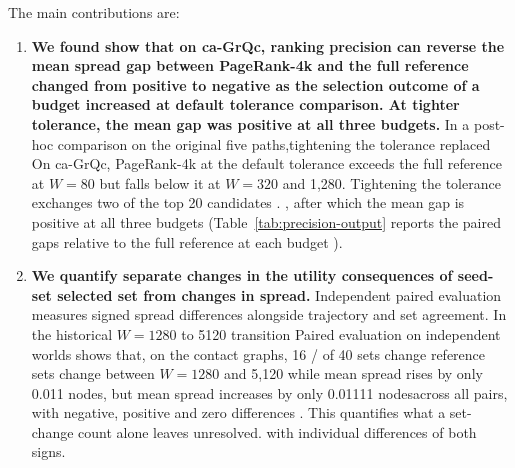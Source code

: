 \documentclass[smallextended]{svjour3}
\providecommand{\DIFaddtex}[1]{{\protect\color{blue} \sf #1}} %
\providecommand{\DIFdeltex}[1]{{\protect\color{red} \scriptsize #1}} %
\providecommand{\DIFaddbegin}{} %
\providecommand{\DIFaddend}{} %
\providecommand{\DIFdelbegin}{} %
\providecommand{\DIFdelend}{} %
\providecommand{\DIFadd}[1]{\texorpdfstring{\DIFaddtex{#1}}{#1}} %
\providecommand{\DIFdel}[1]{\texorpdfstring{\DIFdeltex{#1}}{}} %
\providecommand{\DIFscaledelfig}{0.5}
\newlength{\DIFdelgraphicswidth} %
\newlength{\DIFdelgraphicsheight} %
\providecommand{\DIFaddincludegraphics}[2][]{{\color{blue}\fbox{\DIFOincludegraphics[#1]{#2}}}} %
\providecommand{\DIFdelincludegraphics}[2][]{%
\sbox{\DIFdelgraphicsbox}{\DIFOincludegraphics[#1]{#2}}%
\settoboxwidth{\DIFdelgraphicswidth}{\DIFdelgraphicsbox} %
\settoboxtotalheight{\DIFdelgraphicsheight}{\DIFdelgraphicsbox} %
\scalebox{\DIFscaledelfig}{%
\parbox[b]{\DIFdelgraphicswidth}{\usebox{\DIFdelgraphicsbox}\\[-\baselineskip] \rule{\DIFdelgraphicswidth}{0em}}\llap{\resizebox{\DIFdelgraphicswidth}{\DIFdelgraphicsheight}{%
\setlength{\unitlength}{\DIFdelgraphicswidth}%
\begin{picture}(1,1)%
\thicklines\linethickness{2pt} %
{\color[rgb]{1,0,0}\put(0,0){\framebox(1,1){}}}%
{\color[rgb]{1,0,0}\put(0,0){\line( 1,1){1}}}%
{\color[rgb]{1,0,0}\put(0,1){\line(1,-1){1}}}%
\end{picture}%
}\hspace*{3pt}}} %
} %
\DeclareRobustCommand{\DIFaddbegin}{\DIFOaddbegin \let\includegraphics\DIFaddincludegraphics} %
\DeclareRobustCommand{\DIFaddend}{\DIFOaddend \let\includegraphics\DIFOincludegraphics} %
\DeclareRobustCommand{\DIFdelbegin}{\DIFOdelbegin \let\includegraphics\DIFdelincludegraphics} %
\DeclareRobustCommand{\DIFdelend}{\DIFOaddend \let\includegraphics\DIFOincludegraphics} %
\begin{document}
The main contributions are:
\begin{enumerate}
\item[(1)] \textbf{We \DIFdelbegin \DIFdel{found }\DIFdelend \DIFaddbegin \DIFadd{show }\DIFaddend that \DIFdelbegin \DIFdel{on ca-GrQc, }\DIFdelend \DIFaddbegin \DIFadd{ranking precision can reverse }\DIFaddend the \DIFdelbegin \DIFdel{mean spread gap between PageRank-4k and the full reference changed from positive to negative as the selection }\DIFdelend \DIFaddbegin \DIFadd{outcome of a }\DIFaddend budget \DIFdelbegin \DIFdel{increased at default tolerance}\DIFdelend \DIFaddbegin \DIFadd{comparison}\DIFaddend .\DIFdelbegin \DIFdel{At tighter tolerance, the mean gap was positive at all three budgets.}\DIFdelend } \DIFdelbegin \DIFdel{In a post-hoc comparison on the original five paths,tightening the tolerance replaced }\DIFdelend \DIFaddbegin \DIFadd{On ca-GrQc, PageRank-4k at the default tolerance exceeds the full reference at $W=80$ but falls below it at $W=320$ and 1,280. Tightening the tolerance exchanges }\DIFaddend two of the \DIFdelbegin \DIFdel{top }\DIFdelend 20 candidates\DIFdelbegin \DIFdel{. }\DIFdelend \DIFaddbegin \DIFadd{, after which the mean gap is positive at all three budgets (}\DIFaddend Table~\ref{tab:precision-output}\DIFdelbegin \DIFdel{reports the paired gaps relative to the full reference at each budget}\DIFdelend \DIFaddbegin \DIFadd{)}\DIFaddend .
\item[(2)] \textbf{We \DIFdelbegin \DIFdel{quantify }\DIFdelend \DIFaddbegin \DIFadd{separate changes in }\DIFaddend the \DIFdelbegin \DIFdel{utility consequences of seed-set }\DIFdelend \DIFaddbegin \DIFadd{selected set from }\DIFaddend changes \DIFaddbegin \DIFadd{in spread}\DIFaddend .} \DIFdelbegin \DIFdel{Independent paired evaluation measures signed spread differences alongside trajectory and set agreement. In the historical $W=1280$ to 5120 transition}\DIFdelend \DIFaddbegin \DIFadd{Paired evaluation on independent worlds shows that, on the contact graphs}\DIFaddend , 16 \DIFdelbegin \DIFdel{/}\DIFdelend \DIFaddbegin \DIFadd{of }\DIFaddend 40 \DIFdelbegin \DIFdel{sets change}\DIFdelend \DIFaddbegin \DIFadd{reference sets change between $W=1280$ and 5,120 while mean spread rises by only 0.011 nodes}\DIFaddend , \DIFdelbegin \DIFdel{but mean spread increases by only 0.01111 nodesacross all pairs, with negative, positive and zero differences . This quantifies what a set-change count alone leaves unresolved.
}\DIFdelend \DIFaddbegin \DIFadd{with individual differences of both signs.
}
\end{enumerate}
\end{document}
